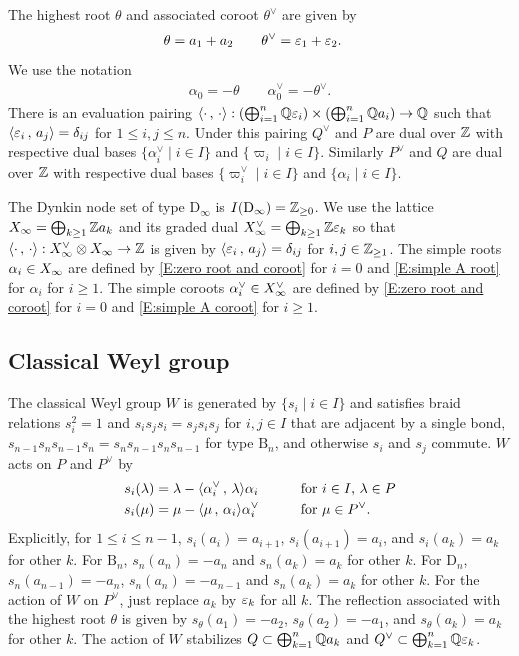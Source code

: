\documentclass[a4paper]{amsart}
\theoremstyle{remark}
\numberwithin{equation}{section}
\begin{document}
The highest root $\theta$ and associated coroot $\theta^\lor$ are given by
\begin{align}
\label{E:highest root and associated coroot}
    \theta &= a_1 + a_2 \qquad \theta^\lor = \varepsilon_1 + \varepsilon_2.
\end{align}
We use the notation 
\begin{align}\label{E:zero root and coroot}
    \alpha_0 = -\theta\qquad \alpha_0^\lor = -\theta^\lor.
\end{align}
There is an evaluation pairing $\langle \cdot\,,\,\cdot\rangle: (\bigoplus_{i=1}^n \mathbb{Q} \varepsilon_i) \times (\bigoplus_{i=1}^n \mathbb{Q} a_i) \to \mathbb{Q}$ such that $\langle \varepsilon_i\,,\,a_j\rangle=\delta_{ij}$ for $1\le i,j\le n$.
Under this pairing $Q^\lor$ and $P$ are dual over $\mathbb{Z}$ with respective dual bases
$\{\alpha_i^\lor\mid i\in I\}$ and $\{\varpi_i\mid i\in I\}$.
Similarly $P^\lor$ and $Q$ are dual over $\mathbb{Z}$ with respective dual bases
$\{\varpi^\lor_i\mid i\in I\}$ and $\{\alpha_i\mid i\in I\}$.

The Dynkin node set of type $\mathrm{D}_\infty$ is $I(\mathrm{D}_\infty)=\mathbb{Z}_{\ge0}$.
We use the lattice $X_\infty = \bigoplus_{k\ge1} \mathbb{Z} a_k$ 
and its graded dual $X_\infty^\vee = \bigoplus_{k\ge1} \mathbb{Z}\varepsilon_k$ so that 
$\langle \cdot\,,\,\cdot\rangle: X_\infty^\vee\otimes X_\infty\to \mathbb{Z}$ is given by
$\langle \varepsilon_i\,,\,a_j\rangle=\delta_{ij}$ for $i,j\in \mathbb{Z}_{\ge 1}$. The simple roots
$\alpha_i\in X_\infty$ are defined by \eqref{E:zero root and coroot} for $i=0$ 
and \eqref{E:simple A root} for $\alpha_i$ for $i\ge1$. The simple coroots
$\alpha_i^\lor\in X_\infty^\vee$ are defined by \eqref{E:zero root and coroot} for $i=0$
and \eqref{E:simple A coroot} for $i\ge1$. 

\subsection{Classical Weyl group}
\label{SS:classical weyl}
The classical Weyl group $W$ is generated by $\{s_i\mid i\in I\}$ and satisfies braid relations $s_i^2=1$ and $s_i s_j s_i = s_j s_i s_j$ for $i,j\in I$ that are adjacent by a single bond, $s_{n-1}s_ns_{n-1}s_n=s_ns_{n-1}s_ns_{n-1}$ for type $\mathrm{B}_n$, and otherwise $s_i$ and $s_j$ commute. $W$ acts on $P$ and $P^\lor$ by 
\begin{align}
\label{E:simple reflection on weight}
  s_i(\lambda) &= \lambda - \langle \alpha_i^\lor\,,\,\lambda\rangle \alpha_i&\qquad&\text{for $i\in I$, $\lambda\in P$} \\
\label{E:simple reflection on coweight}
  s_i(\mu) &= \mu -  \langle \mu\,,\,\alpha_i\rangle\alpha_i^\lor&&\text{for $\mu\in P^\lor$.}
\end{align}
Explicitly, for $1\le i\le n-1$, $s_i(a_i)=a_{i+1}$, $s_i(a_{i+1})=a_i$, and $s_i(a_k)=a_k$ for other $k$. For $\mathrm{B}_n$, $s_n(a_n)=-a_n$ and $s_n(a_k)=a_k$ for other $k$. For $\mathrm{D}_n$, 
$s_n(a_{n-1})=-a_n$, $s_n(a_n)=-a_{n-1}$ and $s_n(a_k)=a_k$ for other $k$. For the action of $W$ on $P^\lor$, just replace $a_k$ by $\varepsilon_k$ for all $k$. The reflection associated with the highest root $\theta$ is given by 
$s_\theta(a_1)=-a_2$, $s_\theta(a_2)=-a_1$, and $s_\theta(a_k)=a_k$ for other $k$.
The action of $W$ stabilizes $Q\subset \bigoplus_{k=1}^n \mathbb{Q} a_k$
and $Q^\lor \subset \bigoplus_{k=1}^n \mathbb{Q} \varepsilon_k$.
\end{document}
